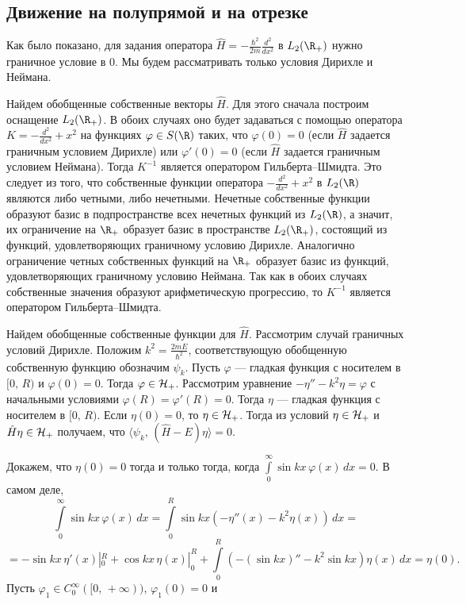 \documentclass[a4paper
]{article}
\begin{document}
\subsection{Движение на полупрямой и на отрезке}
Как было показано, для задания оператора $\hat H=-\frac{\hbar^2}{2m}
\frac{d^2}{dx^2}$ в $L_2(\R_+)$ нужно граничное условие в 0. Мы
будем рассматривать только условия Дирихле и Неймана. \par
Найдем обобщенные собственные векторы $\hat H$. Для этого сначала
построим оснащение $L_2(\R_+)$. В обоих случаях оно будет задаваться
с помощью оператора $K=-\frac{d^2}{dx^2}+x^2$ на функциях $\varphi\in S(\R)$
таких, что $\varphi(0)=0$ (если $\hat H$ задается граничным условием
Дирихле) или $\varphi'(0)=0$ (если $\hat H$ задается граничным условием
Неймана). Тогда $K^{-1}$ является оператором Гильберта--Шмидта. Это
следует из того, что собственные функции оператора $-\frac{d^2}{dx^2}
+x^2$ в $L_2(\R)$ являются либо четными, либо нечетными. Нечетные
собственные функции образуют базис в подпространстве всех нечетных
функций из $L_2(\R)$, а значит, их ограничение на $\R_+$ образует
базис в пространстве $L_2(\R_+)$, состоящий из функций, удовлетворяющих
граничному условию Дирихле. Аналогично ограничение четных собственных
функций на $\R_+$ образует базис из функций, удовлетворяющих
граничному условию Неймана. Так как в обоих случаях собственные
значения образуют арифметическую прогрессию, то $K^{-1}$ является
оператором Гильберта--Шмидта. \par
Найдем обобщенные собственные функции для $\hat H$. Рассмотрим случай
граничных условий Дирихле. Положим $k^2=\frac{2mE}{\hbar^2}$,
соответствующую обобщенную собственную функцию обозначим $\psi_k$.
Пусть $\varphi$ --- гладкая функция с носителем в $[0, \, R)$ и
$\varphi(0)=0$. Тогда $\varphi\in {\cal H}_+$.
Рассмотрим уравнение $-\eta''-k^2\eta=\varphi$ с начальными условиями
$\varphi(R)=\varphi'(R)=0$. Тогда $\eta$ --- гладкая функция с носителем в
$[0, \, R)$. Если $\eta(0)=0$, то $\eta\in {\cal H}_+$. Тогда из
условий $\eta\in {\cal H}_+$ и $\hat H\eta\in {\cal H}_+$ получаем, что
$\langle \psi_k, \, (\hat H-E)\eta\rangle=0$. \par
Докажем, что $\eta(0)=0$ тогда и только тогда, когда $\int \limits_0^\infty
\sin kx \, \varphi(x)\, dx=0$. В самом деле, $$\int \limits_0^\infty
\sin kx \, \varphi(x)\, dx=\int \limits_0^R\sin kx (-\eta''(x)-k^2
\eta(x))\, dx=$$ $$=-\sin kx\, \eta'(x)|_0^R+\cos kx\, \eta(x)|_0^R+
\int \limits_0^R (-(\sin kx)''-k^2\sin kx)\eta(x)\, dx=\eta(0).$$
Пусть $\varphi_1\in C_0^\infty([0, \, +\infty))$, $\varphi_1(0)=0$ и
\end{document}
